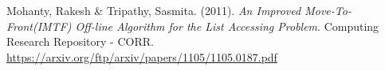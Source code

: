 \begin{thebibliography}{99} %


Mohanty, Rakesh & Tripathy, Sasmita. (2011). \emph{An Improved Move-To-Front(IMTF) Off-line Algorithm for the List Accessing Problem}. Computing Research Repository - CORR. \url{https://arxiv.org/ftp/arxiv/papers/1105/1105.0187.pdf}

\end{thebibliography}